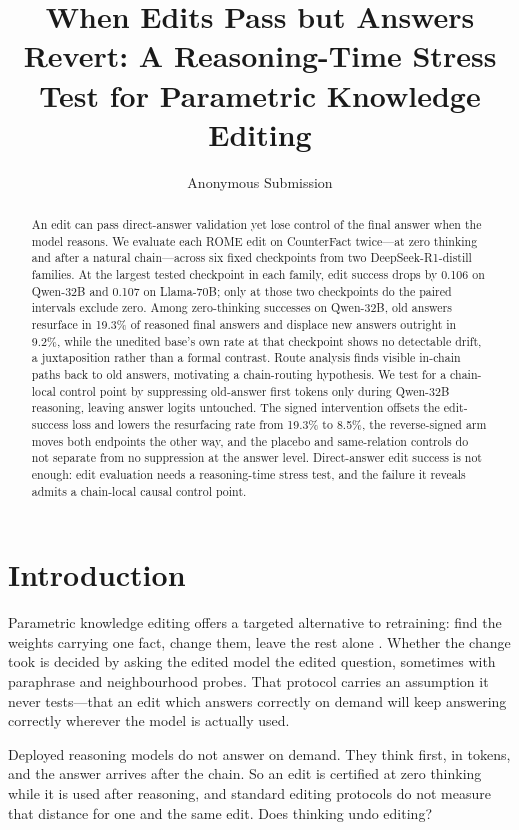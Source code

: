 \documentclass[letterpaper]{article} %
\title{When Edits Pass but Answers Revert: A Reasoning-Time Stress Test for Parametric Knowledge Editing}
\author{Anonymous Submission}
\begin{document}
\maketitle

\begin{abstract}
An edit can pass direct-answer validation yet lose control of the final answer when the model reasons. We evaluate each ROME edit on CounterFact twice—at zero thinking and after a natural chain—across six fixed checkpoints from two DeepSeek-R1-distill families. At the largest tested checkpoint in each family, edit success drops by 0.106 on Qwen-32B and 0.107 on Llama-70B; only at those two checkpoints do the paired intervals exclude zero. Among zero-thinking successes on Qwen-32B, old answers resurface in 19.3\% of reasoned final answers and displace new answers outright in 9.2\%, while the unedited base's own rate at that checkpoint shows no detectable drift, a juxtaposition rather than a formal contrast. Route analysis finds visible in-chain paths back to old answers, motivating a chain-routing hypothesis. We test for a chain-local control point by suppressing old-answer first tokens only during Qwen-32B reasoning, leaving answer logits untouched. The signed intervention offsets the edit-success loss and lowers the resurfacing rate from 19.3\% to 8.5\%, the reverse-signed arm moves both endpoints the other way, and the placebo and same-relation controls do not separate from no suppression at the answer level. Direct-answer edit success is not enough: edit evaluation needs a reasoning-time stress test, and the failure it reveals admits a chain-local causal control point.
\end{abstract}

\section{Introduction}
\label{sec:introduction}

Parametric knowledge editing offers a targeted alternative to retraining: find the weights carrying one fact, change them, leave the rest alone \citep{meng2022rome}.  Whether the change took is decided by asking the edited model the edited question, sometimes with paraphrase and neighbourhood probes.  That protocol carries an assumption it never tests---that an edit which answers correctly on demand will keep answering correctly wherever the model is actually used.

Deployed reasoning models do not answer on demand.  They think first, in tokens, and the answer arrives after the chain.  So an edit is certified at zero thinking while it is used after reasoning, and standard editing protocols do not measure that distance for one and the same edit.  Does thinking undo editing?
\end{document}
